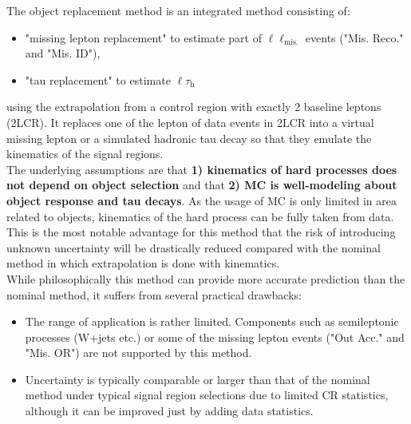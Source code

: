 The object replacement method is an integrated method consisting of:
\begin{itemize}
\item "missing lepton replacement" to estimate part of $\ell\ell_{\mathrm{mis.}}$ events ("Mis. Reco." and "Mis. ID"),
\item "tau replacement" to estimate $\ell\tau_{\mathrm{h}}$
\end{itemize}
using the extrapolation from a control region with exactly 2 baseline leptons (2LCR). It replaces one of the lepton of data events in 2LCR into a virtual missing lepton or a simulated hadronic tau decay so that they emulate the kinematics of the signal regions. \\

The underlying assumptions are that \textbf{1) kinematics of hard processes does not depend on object selection} and that \textbf{2) MC is well-modeling about object response and tau decays}. As the usage of MC is only limited in area related to objects, kinematics of the hard process can be fully taken from data. This is the most notable advantage for this method that the risk of introducing unknown uncertainty will be drastically reduced compared with the nominal method in which extrapolation is done with kinematics. \\
While philosophically this method can provide more accurate prediction than the nominal method, it suffers from several practical drawbacks: 
\begin{itemize}
\item The range of application is rather limited. Components such as semileptonic processes (W+jets etc.) or some of the missing lepton events ("Out Acc." and "Mis. OR") are not supported by this method.
\item Uncertainty is typically comparable or larger than that of the nominal method under typical signal region selections due to limited CR statistics,  although it can be improved just by adding data statistics.
\end{itemize}

